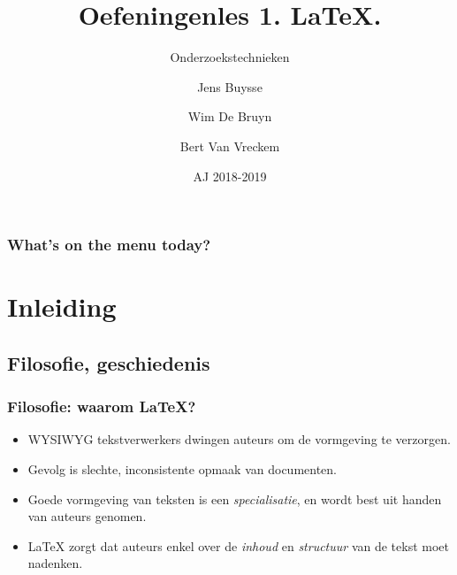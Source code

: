\documentclass[aspectratio=169]{beamer}
\title[OZT: LaTeX]{Oefeningenles 1. {\LaTeX}.}
\subtitle{Onderzoekstechnieken}
\author{Jens Buysse \and Wim {De Bruyn} \and Bert {Van Vreckem}}
\date{AJ 2018-2019}
\begin{document}

\begin{frame}
\maketitle
\end{frame}

\begin{frame}
\frametitle{What's on the menu today?}

\tableofcontents
\end{frame}

\section{Inleiding}

\subsection{Filosofie, geschiedenis}

\begin{frame}
  \frametitle{Filosofie: waarom {\LaTeX}?}
  
  \begin{itemize}
  \item<+-> WYSIWYG tekstverwerkers dwingen auteurs om de vormgeving te verzorgen.
  \item<+-> Gevolg is slechte, inconsistente opmaak van documenten.
  \item<+-> Goede vormgeving van teksten is een \emph{specialisatie}, en wordt best
    uit handen van auteurs genomen.
  \item<+-> {\LaTeX} zorgt dat auteurs enkel over de \emph{inhoud} en \emph{structuur} van de tekst moet nadenken.
  \end{itemize}
\end{frame}
\end{document}
